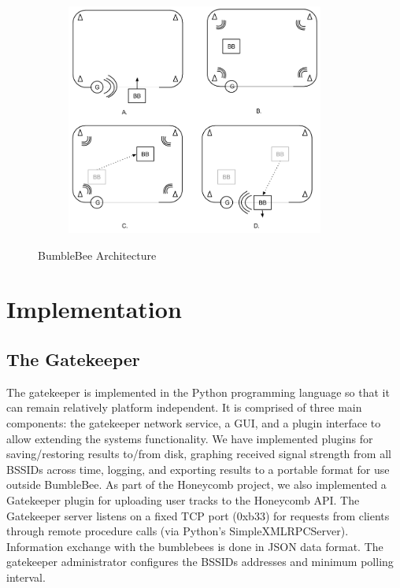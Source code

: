 \begin{figure}[htb] %
	\begin{center}
		\ \includegraphics[width=4in,height=3in]{BumbleBeeExample.png}
		\caption{BumbleBee Architecture}
		\label{bumblebeearch}
	\end{center}
\end{figure}


\section{Implementation}
%


\subsection{The Gatekeeper}
%

The gatekeeper is implemented in the Python programming language so that it can remain relatively platform independent. It is comprised of three main components: the gatekeeper network service, a GUI, and a plugin interface to allow extending the systems functionality. We have implemented plugins for saving/restoring results to/from disk, graphing received signal strength from all BSSIDs across time, logging, and exporting results to a portable format for use outside BumbleBee. As part of the Honeycomb project, we also implemented a Gatekeeper plugin for uploading user tracks to the Honeycomb API. The Gatekeeper server listens on a fixed TCP port (0xb33) for requests from clients through remote procedure calls (via Python’s SimpleXMLRPCServer). Information exchange with the bumblebees is done in JSON data format. The gatekeeper administrator configures the BSSIDs addresses and minimum polling interval.


